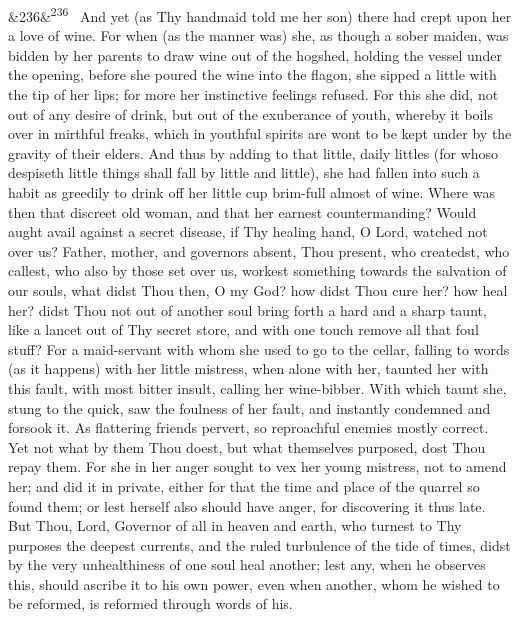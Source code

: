 \documentclass[12pt]{article}
\newcommand{\para}[1][]{\par\noindent\ifx&#1&\else\textsuperscript{\footnotesize #1}~\fi}
\begin{document}
\para[236] And yet (as Thy handmaid told me her son) there had crept upon her a love of wine. For when (as the manner was) she, as though a sober maiden, was bidden by her parents to draw wine out of the hogshed, holding the vessel under the opening, before she poured the wine into the flagon, she sipped a little with the tip of her lips; for more her instinctive feelings refused. For this she did, not out of any desire of drink, but out of the exuberance of youth, whereby it boils over in mirthful freaks, which in youthful spirits are wont to be kept under by the gravity of their elders. And thus by adding to that little, daily littles (for whoso despiseth little things shall fall by little and little), she had fallen into such a habit as greedily to drink off her little cup brim-full almost of wine. Where was then that discreet old woman, and that her earnest countermanding? Would aught avail against a secret disease, if Thy healing hand, O Lord, watched not over us? Father, mother, and governors absent, Thou present, who createdst, who callest, who also by those set over us, workest something towards the salvation of our souls, what didst Thou then, O my God? how didst Thou cure her? how heal her? didst Thou not out of another soul bring forth a hard and a sharp taunt, like a lancet out of Thy secret store, and with one touch remove all that foul stuff? For a maid-servant with whom she used to go to the cellar, falling to words (as it happens) with her little mistress, when alone with her, taunted her with this fault, with most bitter insult, calling her wine-bibber. With which taunt she, stung to the quick, saw the foulness of her fault, and instantly condemned and forsook it. As flattering friends pervert, so reproachful enemies mostly correct. Yet not what by them Thou doest, but what themselves purposed, dost Thou repay them. For she in her anger sought to vex her young mistress, not to amend her; and did it in private, either for that the time and place of the quarrel so found them; or lest herself also should have anger, for discovering it thus late. But Thou, Lord, Governor of all in heaven and earth, who turnest to Thy purposes the deepest currents, and the ruled turbulence of the tide of times, didst by the very unhealthiness of one soul heal another; lest any, when he observes this, should ascribe it to his own power, even when another, whom he wished to be reformed, is reformed through words of his.
\end{document}
